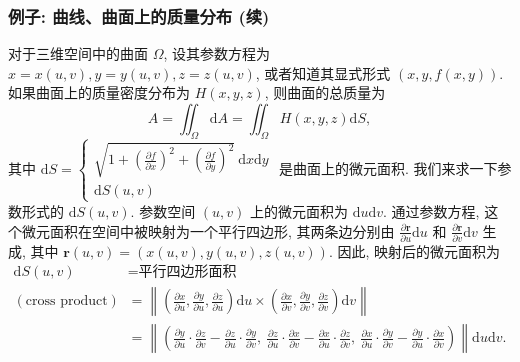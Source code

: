 \begin{frame}
\frametitle{例子: 曲线、曲面上的质量分布 (续)}

对于三维空间中的曲面 $\Omega$, 设其参数方程为 $x = x(u,v), y = y(u,v), z = z(u,v)$, 或者知道其显式形式 $(x, y, f(x,y))$. 如果曲面上的质量密度分布为 $H(x, y, z)$, 则曲面的总质量为
\[
A = \iint_\Omega \mathrm{d}A = \iint_\Omega H(x, y, z) \mathrm{d}S,
\]
其中 $\mathrm{d}S = \begin{cases} \sqrt{1 + \left(\frac{\partial f}{\partial x}\right)^2 + \left(\frac{\partial f}{\partial y}\right)^2} ~ \mathrm{d}x \mathrm{d}y \\ \mathrm{d} S(u, v) \end{cases}$ 是曲面上的微元面积.
\pause
我们来求一下参数形式的 $\mathrm{d} S(u, v)$. 参数空间 $(u,v)$ 上的微元面积为 $\mathrm{d}u \mathrm{d}v$. 通过参数方程, 这个微元面积在空间中被映射为一个平行四边形, 其两条边分别由 $\frac{\partial \mathbf{r}}{\partial u} \mathrm{d}u$ 和 $\frac{\partial \mathbf{r}}{\partial v} \mathrm{d}v$ 生成, 其中 $\mathbf{r}(u,v) = (x(u,v), y(u,v), z(u,v))$. 因此, 映射后的微元面积为
\begin{align*}
\mathrm{d} S(u, v) & = \text{平行四边形面积} \\
(\text{cross product}) & = \left\lVert \left( \frac{\partial x}{\partial u}, \frac{\partial y}{\partial u}, \frac{\partial z}{\partial u} \right) \mathrm{d}u \times \left( \frac{\partial x}{\partial v}, \frac{\partial y}{\partial v}, \frac{\partial z}{\partial v} \right) \mathrm{d}v \right\rVert \\
& = \left\lVert \left( \frac{\partial y}{\partial u} \cdot \frac{\partial z}{\partial v} - \frac{\partial z}{\partial u} \cdot \frac{\partial y}{\partial v}, ~ \frac{\partial z}{\partial u} \cdot \frac{\partial x}{\partial v} - \frac{\partial x}{\partial u} \cdot \frac{\partial z}{\partial v}, ~ \frac{\partial x}{\partial u} \cdot \frac{\partial y}{\partial v} - \frac{\partial y}{\partial u} \cdot \frac{\partial x}{\partial v} \right) \right\rVert \mathrm{d}u \mathrm{d}v.
\end{align*}

\end{frame}


